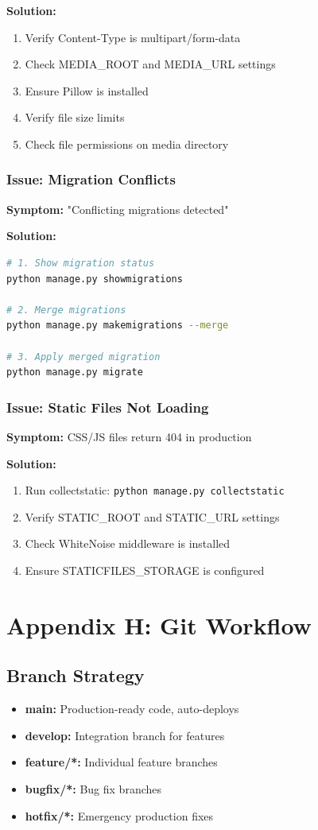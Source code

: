 \documentclass[11pt,a4paper]{article}
\begin{document}
\textbf{Solution:}
\begin{enumerate}[leftmargin=*]
    \item Verify Content-Type is multipart/form-data
    \item Check MEDIA\_ROOT and MEDIA\_URL settings
    \item Ensure Pillow is installed
    \item Verify file size limits
    \item Check file permissions on media directory
\end{enumerate}

\subsubsection{Issue: Migration Conflicts}
\textbf{Symptom:} "Conflicting migrations detected"

\textbf{Solution:}
\begin{lstlisting}[language=bash]
# 1. Show migration status
python manage.py showmigrations

# 2. Merge migrations
python manage.py makemigrations --merge

# 3. Apply merged migration
python manage.py migrate
\end{lstlisting}

\subsubsection{Issue: Static Files Not Loading}
\textbf{Symptom:} CSS/JS files return 404 in production

\textbf{Solution:}
\begin{enumerate}[leftmargin=*]
    \item Run collectstatic: \texttt{python manage.py collectstatic}
    \item Verify STATIC\_ROOT and STATIC\_URL settings
    \item Check WhiteNoise middleware is installed
    \item Ensure STATICFILES\_STORAGE is configured
\end{enumerate}

\section{Appendix H: Git Workflow}

\subsection{Branch Strategy}
\begin{itemize}[leftmargin=*]
    \item \textbf{main:} Production-ready code, auto-deploys
    \item \textbf{develop:} Integration branch for features
    \item \textbf{feature/*:} Individual feature branches
    \item \textbf{bugfix/*:} Bug fix branches
    \item \textbf{hotfix/*:} Emergency production fixes
\end{itemize}
\end{document}
